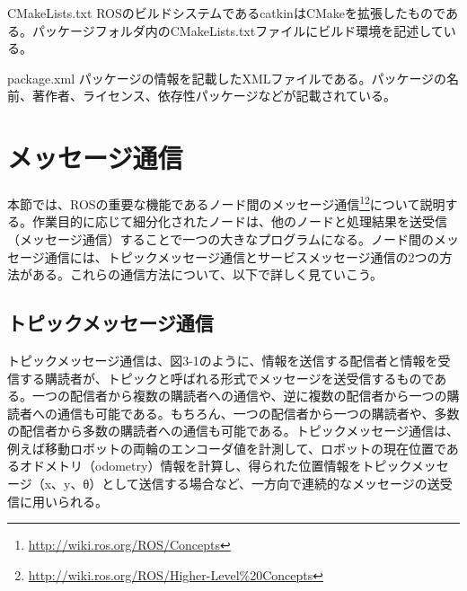 
\begin{term}{CMakeLists.txt}
ROSのビルドシステムであるcatkinはCMakeを拡張したものである。パッケージフォルダ内のCMakeLists.txtファイルにビルド環境を記述している。
\end{term}


\begin{term}{package.xml}
パッケージの情報を記載したXMLファイルである。パッケージの名前、著作者、ライセンス、依存性パッケージなどが記載されている。
\end{term}

\section{メッセージ通信}

本節では、ROSの重要な機能であるノード間のメッセージ通信\footnote{\url{http://wiki.ros.org/ROS/Concepts}}\footnote{\url{http://wiki.ros.org/ROS/Higher-Level\%20Concepts}}について説明する。作業目的に応じて細分化されたノードは、他のノードと処理結果を送受信（メッセージ通信）することで一つの大きなプログラムになる。ノード間のメッセージ通信には、トピックメッセージ通信とサービスメッセージ通信の2つの方法がある。これらの通信方法について、以下で詳しく見ていこう。

\subsection{トピックメッセージ通信}

トピックメッセージ通信は、図3-1のように、情報を送信する配信者と情報を受信する購読者が、トピックと呼ばれる形式でメッセージを送受信するものである。一つの配信者から複数の購読者への通信や、逆に複数の配信者から一つの購読者への通信も可能である。もちろん、一つの配信者から一つの購読者や、多数の配信者から多数の購読者への通信も可能である。トピックメッセージ通信は、例えば移動ロボットの両輪のエンコーダ値を計測して、ロボットの現在位置であるオドメトリ（odometry）情報を計算し、得られた位置情報をトピックメッセージ（x、y、θ）として送信する場合など、一方向で連続的なメッセージの送受信に用いられる。

